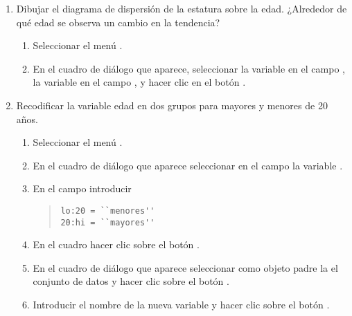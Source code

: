 \begin{enumerate}[leftmargin=*]
\begin{enumerate}
\item Dibujar el diagrama de dispersión de la estatura sobre la edad. 
¿Alrededor de qué edad se observa un cambio en la tendencia? 
\begin{indicacion}{
\begin{enumerate}
\item Seleccionar el menú .
\item En el cuadro de diálogo que aparece, seleccionar la variable  en el campo ,
la variable  en el campo , y hacer clic en el botón .
\end{enumerate}}
\end{indicacion}

\item Recodificar la variable edad en dos grupos para mayores y menores de 20 años.
\begin{indicacion}{
\begin{enumerate}
\item Seleccionar el menú .
\item En el cuadro de diálogo que aparece seleccionar en el campo  la variable
.
\item En el campo  introducir
\begin{quote}
\lstinline{lo:20 = ``menores''}\\
\lstinline{20:hi = ``mayores''}
\end{quote}
\item En el cuadro  hacer clic sobre el botón .
\item En el cuadro de diálogo que aparece seleccionar como objeto padre la el conjunto de datos  y hacer clic sobre el botón .
\item Introducir el nombre de la nueva variable  y hacer clic sobre el botón .
\end{enumerate}}
\end{indicacion}


\end{enumerate}
\end{enumerate}
